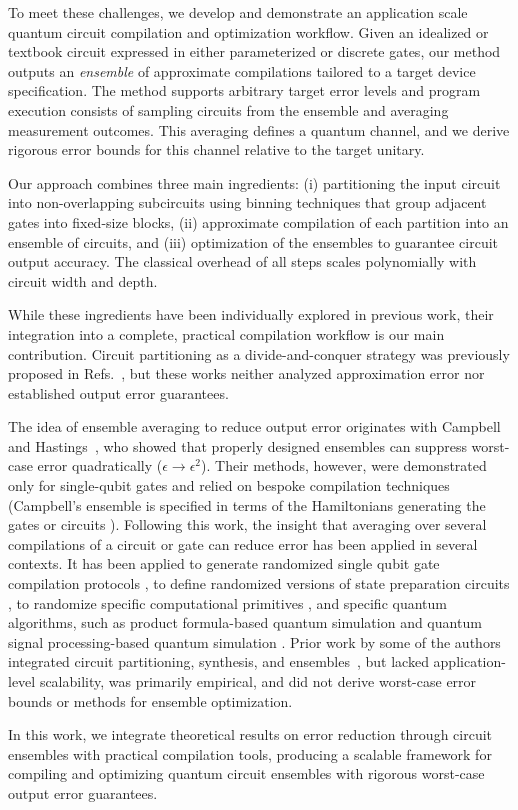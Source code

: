 To meet these challenges, we develop and demonstrate an application scale quantum
circuit compilation and optimization workflow. Given an idealized or textbook circuit
expressed in either parameterized or discrete gates, our method
outputs an \emph{ensemble} of approximate compilations tailored to a
target device specification. The method supports arbitrary target error
levels and program execution consists of sampling circuits from the
ensemble and averaging measurement outcomes. This averaging defines a
quantum channel, and we derive rigorous error bounds for this channel
relative to the target unitary.

Our approach combines three main ingredients: (i) partitioning the
input circuit into non-overlapping subcircuits using binning
techniques that group adjacent gates into fixed-size blocks, (ii)
approximate compilation of each partition into an ensemble of
circuits, and (iii) optimization of the ensembles to guarantee circuit
output accuracy. The classical overhead of all steps scales
polynomially with circuit width and depth.

While these ingredients have been individually explored in previous work, their
integration into a complete, practical compilation workflow is our
main contribution. Circuit partitioning as a divide-and-conquer
strategy was previously proposed in Refs.~\cite{wu_qgo,Burt_2024}, but
these works neither analyzed approximation error nor established
output error guarantees.

The idea of ensemble averaging to reduce output error originates with
Campbell~\cite{PhysRevA.95.042306} and
Hastings~\cite{hastings2016turning}, who showed that properly designed
ensembles can suppress worst-case error quadratically
($\epsilon \rightarrow \epsilon^2$). Their methods, however, were
demonstrated only for single-qubit gates and relied on bespoke
compilation techniques (\eg Campbell's ensemble is
specified in terms of the Hamiltonians generating the gates or
circuits \cite{PhysRevA.95.042306}). Following this work, the insight
that averaging over several compilations of a circuit or gate can
reduce error has been applied in several contexts.  It has been
applied to generate randomized single qubit gate compilation
protocols \cite{Kliuchnikov_2023,Akibu_ACM_2024,yoshioka2024errorcrafting},
to define randomized versions of state preparation
circuits \cite{Akibue2024}, to randomize specific computational
primitives \cite{low2021halving}, and specific quantum algorithms,
such as product formula-based quantum
simulation \cite{campbell_qdrift,
Ouyang2020compilation,PRXQuantum.2.040305,huang_2023,PhysRevResearch.6.013224,PhysRevA.109.062431}
and quantum signal processing-based quantum
simulation \cite{martyn2024}.  Prior work by some of the authors
integrated circuit partitioning, synthesis, and
ensembles~\cite{patel_2021}, but lacked application-level scalability,
was primarily empirical, and did not derive worst-case error bounds or
methods for ensemble optimization.

In this work, we integrate theoretical results on error reduction
through circuit ensembles with practical compilation tools, producing
a scalable framework for compiling and optimizing quantum circuit ensembles with
rigorous worst-case output error guarantees.










